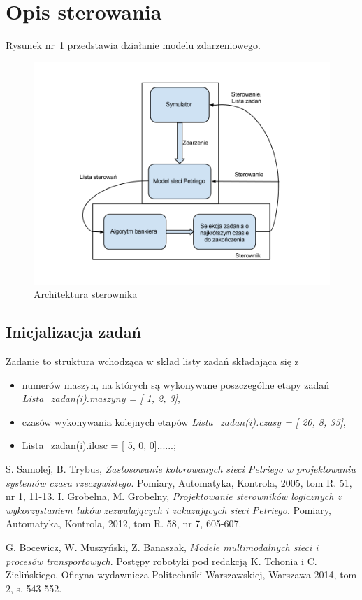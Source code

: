 \documentclass[10pt, a4paper]{article}
\begin{document}
\section{Opis sterowania}
Rysunek nr~\ref{fig:alg} przedstawia działanie modelu zdarzeniowego.
 \begin{figure}[htbp]
  \begin{center}
    \includegraphics[width=1\textwidth]{./obrazki/alg.png}
    \caption{Architektura sterownika}
    \label{fig:alg}
  \end{center}
 \end{figure}
\subsection{Inicjalizacja zadań}
Zadanie to struktura wchodząca w skład listy zadań składająca się z
\begin{itemize}
\item  numerów maszyn, na których są wykonywane poszczególne etapy zadań \textit{Lista\_zadan(i).maszyny = [  1,  2,  3]},
\item czasów wykonywania kolejnych etapów \textit{Lista\_zadan(i).czasy = [ 20,  8, 35]},
\item Lista\_zadan(i).ilosc   = [  5,  0,  0]......;
\end{itemize}


\begin{thebibliography}{9}
  S. Samolej, B. Trybus,
  \emph{Zastosowanie kolorowanych sieci Petriego w projektowaniu systemów czasu rzeczywistego}.
  Pomiary, Automatyka, Kontrola,
  2005,
  tom R. 51, nr 1,
  11-13.
  I. Grobelna, M. Grobelny,
  \emph{Projektowanie sterowników logicznych z wykorzystaniem łuków zezwalających i zakazujących sieci Petriego}.	
  Pomiary, Automatyka, Kontrola,
  2012,
  tom R. 58, nr 7,
  605-607.
  
  G. Bocewicz, W. Muszyński, Z. Banaszak,
  \emph{Modele multimodalnych sieci i procesów transportowych}.
  Postępy robotyki pod redakcją K. Tchonia i C. Zielińskiego,
  Oficyna wydawnicza Politechniki Warszawskiej,
   Warszawa 2014,
   tom 2, s. 543-552.

\end{thebibliography}
\end{document}

